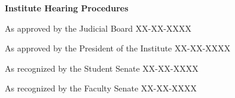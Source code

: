 \documentclass[11pt]{article}
\newcommand{\JBBodyFont}{\fontsize{10.5pt}{13.6pt}\selectfont}
\newcommand{\JBLogoWidth}{3.15in}
\newcommand{\JBDisplayTitle}{Institute Hearing Procedures}
\newcommand{\JBApprovalLineOne}{As approved by the Judicial Board XX-XX-XXXX}
\newcommand{\JBApprovalLineTwo}{As approved by the President of the Institute XX-XX-XXXX}
\newcommand{\JBApprovalLineThree}{As recognized by the Student Senate XX-XX-XXXX}
\newcommand{\JBApprovalLineFour}{As recognized by the Faculty Senate XX-XX-XXXX}
\begin{document}
\thispagestyle{empty}
\JBBodyFont

\begin{center}
  
\end{center}
\vspace{0.35cm}

\begin{center}
  {\fontsize{18pt}{21.6pt}\selectfont\bfseries\color{RPIBlack} \JBDisplayTitle\par}
\end{center}
\vspace{0.18cm}

\begin{center}
  {\fontsize{11pt}{13.2pt}\selectfont\color{RPIBlack} \JBApprovalLineOne\par}
\end{center}
\begin{center}
  {\fontsize{11pt}{13.2pt}\selectfont\color{RPIBlack} \JBApprovalLineTwo\par}
\end{center}
\begin{center}
  {\fontsize{11pt}{13.2pt}\selectfont\color{RPIBlack} \JBApprovalLineThree\par}
\end{center}
\begin{center}
  {\fontsize{11pt}{13.2pt}\selectfont\color{RPIBlack} \JBApprovalLineFour\par}
\end{center}

\vspace{0.8cm}

\clearpage


\end{document}

